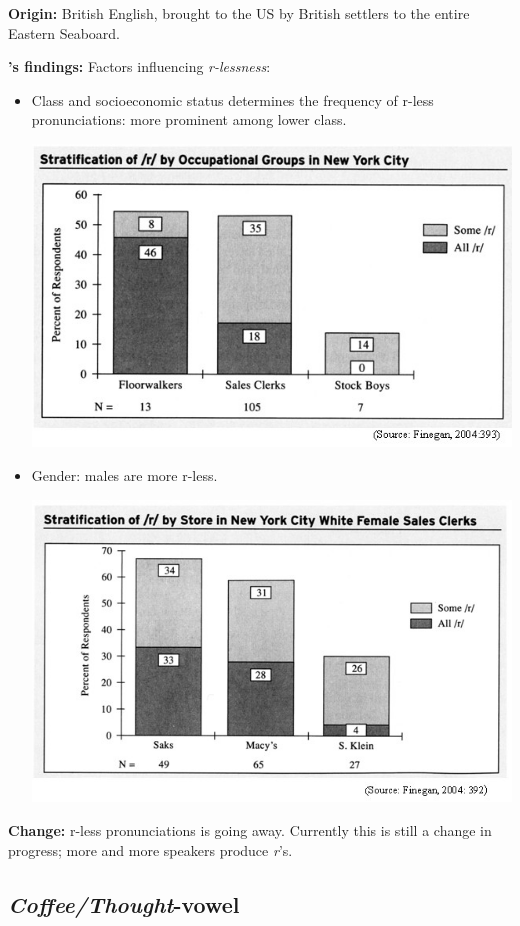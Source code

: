 \documentclass[11pt]{article}
\newcommand{\1}{$'$}
\newcommand{\2}{$''$}
\newcommand{\3}{$'''$}
\begin{document}
\vspace{1em}

\textbf{Origin:} British English, brought to the US by British settlers to the entire Eastern Seaboard.

\textbf{\citealp{Labov:1966}'s findings:} Factors influencing \emph{r-lessness}:

\begin{itemize}
\item Class and socioeconomic status determines the frequency of r-less pronunciations: more prominent among lower class.

\begin{center}
\includegraphics[width=.7\textwidth]{stratification}
\end{center}

\item Gender: males are more r-less.

\begin{center}
\includegraphics[width=.7\textwidth]{classpatternlabov2}
\end{center}
\end{itemize}

\noindent \textbf{Change:} r-less pronunciations is going away. Currently this is still a change in progress; more and more speakers produce \emph{r}'s.

\subsection{\emph{Coffee/Thought}-vowel}
\end{document}
